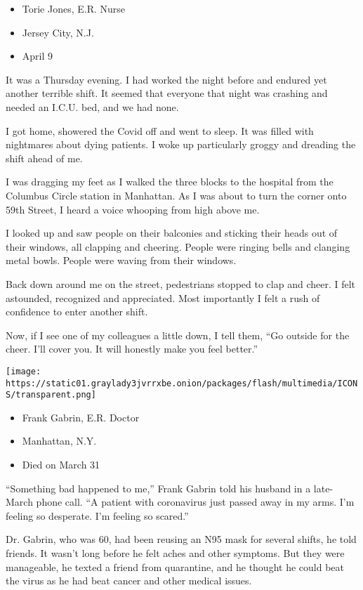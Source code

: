 \begin{itemize}
\tightlist
\item
  Torie Jones, E.R. Nurse
\item
  Jersey City, N.J.
\item
  April 9
\end{itemize}

It was a Thursday evening. I had worked the night before and endured yet
another terrible shift. It seemed that everyone that night was crashing
and needed an I.C.U. bed, and we had none.

I got home, showered the Covid off and went to sleep. It was filled with
nightmares about dying patients. I woke up particularly groggy and
dreading the shift ahead of me.

I was dragging my feet as I walked the three blocks to the hospital from
the Columbus Circle station in Manhattan. As I was about to turn the
corner onto 59th Street, I heard a voice whooping from high above me.

I looked up and saw people on their balconies and sticking their heads
out of their windows, all clapping and cheering. People were ringing
bells and clanging metal bowls. People were waving from their windows.

Back down around me on the street, pedestrians stopped to clap and
cheer. I felt astounded, recognized and appreciated. Most importantly I
felt a rush of confidence to enter another shift.

Now, if I see one of my colleagues a little down, I tell them, ``Go
outside for the cheer. I'll cover you. It will honestly make you feel
better.''

\texttt{[image: https://static01.graylady3jvrrxbe.onion/packages/flash/multimedia/ICONS/transparent.png]}

\begin{itemize}
\tightlist
\item
  Frank Gabrin, E.R. Doctor
\item
  Manhattan, N.Y.
\item
  Died on March 31
\end{itemize}

``Something bad happened to me,'' Frank Gabrin told his husband in a
late-March phone call. ``A patient with coronavirus just passed away in
my arms. I'm feeling so desperate. I'm feeling so scared.''

Dr. Gabrin, who was 60, had been reusing an N95 mask for several shifts,
he told friends. It wasn't long before he felt aches and other symptoms.
But they were manageable, he texted a friend from quarantine, and he
thought he could beat the virus as he had beat cancer and other medical
issues.

